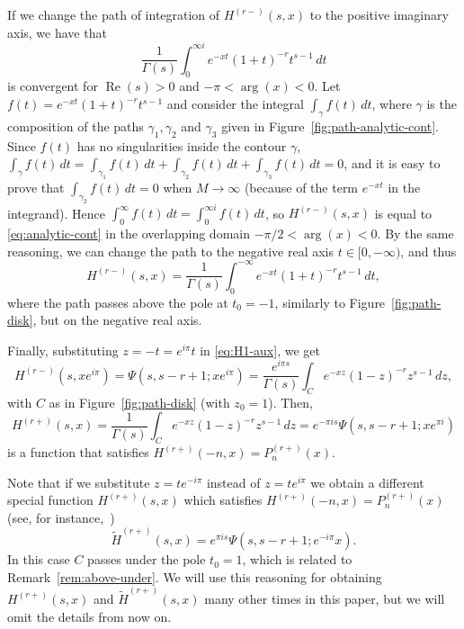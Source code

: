 \documentclass[11pt,a4paper]{amsart}
\renewcommand{\Re}{\operatorname{Re}}
\theoremstyle{plain}
\theoremstyle{plain}
\theoremstyle{remark}
\numberwithin{equation}{section}
\begin{document}
If we change the path of integration of $H^{(r-)}(s,x)$ to the positive imaginary axis, we have that
\begin{equation}
\label{eq:analytic-cont}
  \frac{1}{\Gamma(s)}\int_0^{\infty i}e^{-xt}(1+t)^{-r} t^{s-1}\,dt
\end{equation}
is convergent for $\Re(s)>0$ and $-\pi < \arg(x) <0$. Let $f(t) = e^{-xt}(1+t)^{-r} t^{s-1}$ and consider the integral $\int_{\gamma} f(t)\,dt$, where $\gamma$ is the composition of the paths $\gamma_1, \gamma_2$ and $\gamma_3$ given in Figure~\ref{fig:path-analytic-cont}. Since $f(t)$ has no singularities inside the contour $\gamma$, $\int_{\gamma} f(t)\,dt = \int_{\gamma_1} f(t)\,dt + \int_{\gamma_2} f(t)\,dt + \int_{\gamma_3} f(t)\,dt = 0$, and it is easy to prove that $\int_{\gamma_2} f(t)\,dt = 0$ when $M\to \infty$ (because of the term $e^{-xt}$ in the integrand).
Hence $\int_0^{\infty} f(t)\,dt = \int_{0}^{\infty i} f(t)\,dt$, so $H^{(r-)}(s,x)$ is equal to \eqref{eq:analytic-cont} in the overlapping domain $-\pi/2 < \arg(x) <0$. By the same reasoning, we can change the path to the negative real axis $t\in [0,-\infty)$, and thus
\begin{equation}
\label{eq:H1-aux}
  H^{(r-)}(s,x) = \frac{1}{\Gamma(s)} \int_0^{-\infty}e^{-xt}(1+t)^{-r} t^{s-1}\,dt,
\end{equation} 
where the path passes above the pole at $t_0=-1$, similarly to  Figure~\ref{fig:path-disk}, but on the negative real axis.

Finally, substituting $z=-t=e^{i\pi}t$ in \eqref{eq:H1-aux}, we get
\begin{equation*}
  H^{(r-)}(s,xe^{i\pi}) = \Psi(s,s-r+1;xe^{i\pi}) 
  = \frac{e^{i\pi s}}{\Gamma(s)} \int_C e^{-xz}(1-z)^{-r} z^{s-1}\,dz,
\end{equation*}
with $C$ as in Figure~\ref{fig:path-disk} (with $z_0=1$).
Then,
\begin{equation}
\label{eq:Hr-1+t}
  H^{(r+)}(s,x) = \frac{1}{\Gamma(s)} \int_{C} e^{-xz}(1-z)^{-r} z^{s-1}\, dz 
  = e^{-\pi i s}\Psi(s,s-r+1;xe^{\pi i})
\end{equation}
is a function that satisfies $H^{(r+)}(-n,x) = P_n^{(r+)}(x)$.

Note that if we substitute $z = te^{-i\pi}$ instead of $z = te^{i\pi}$ we obtain a different special function $H^{(r+)}(s,x)$ which satisfies $H^{(r+)}(-n,x) = P_n^{(r+)}(x)$ (see, for instance,~\cite{Temme})
\[
  \widetilde{H}^{(r+)}(s,x) = e^{\pi i s}\Psi(s,s-r+1;e^{-i\pi}x).
\]
In this case $C$ passes under the pole $t_0=1$, which is related to Remark~\ref{rem:above-under}. We will use this reasoning for obtaining $H^{(r+)}(s,x)$ and $\widetilde{H}^{(r+)}(s,x)$ many other times in this paper, but we will omit the details from now on.
\end{document}
